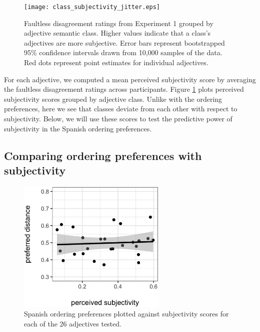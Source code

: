 \documentclass[12pt,letterpaper]{article}
\begin{document}
\begin{figure}[t]
	\centering
	\texttt{[image: class\_subjectivity\_jitter.eps]}
	\caption{Faultless disagreement ratings from Experiment 1 grouped by adjective semantic class. Higher values indicate that a class's adjectives are more subjective. Error bars represent bootstrapped 95\% confidence intervals drawn from 10,000 samples of the data. Red dots represent point estimates for individual adjectives.
	}
	\label{exp2-results}
\end{figure}

For each adjective, we computed a mean perceived subjectivity score by averaging the faultless disagreement ratings across participants. Figure \ref{exp2-results} plots perceived subjectivity scores grouped by adjective class. Unlike with the ordering preferences, here we see that classes deviate from each other with respect to subjectivity. Below, we will use these scores to test the predictive power of subjectivity in the Spanish ordering preferences.

\subsection{Comparing ordering preferences with subjectivity}

\begin{figure}[t]
	\centering
	\includegraphics[height=2.5in]{naturalness-subjectivity-spanish-LSA-proceedings.eps}
	\caption{Spanish ordering preferences plotted against subjectivity scores for each of the 26 adjectives tested. %
	}
	\label{subj-comparison}
\end{figure}
\end{document}
